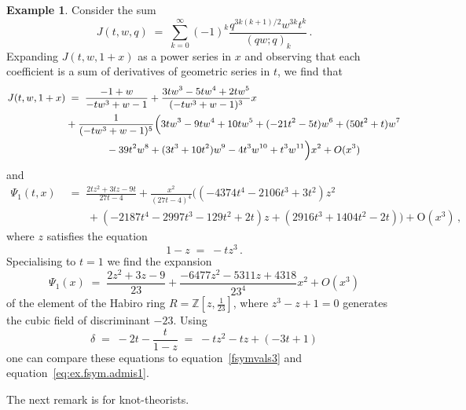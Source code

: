 \documentclass[12pt,reqno]{amsart}
\theoremstyle{definition}
\newtheorem{example}[proposition]{Example}
\def\BZ{\mathbb Z}
\def\be{\begin{equation}}
\def\ee{\end{equation}}
\def\={\;=\;}
\begin{document}
\begin{example}
\label{ex.23}
Consider the sum
\be
J(t,w,q)
\=
\sum_{k=0}^{\infty}
(-1)^{k}\frac{q^{3k(k+1)/2}w^{3k}t^k}{(qw;q)_{k}} \,.
\ee
Expanding $J(t,w,1+x)$ as a power series in $x$ and observing that each coefficient
is a sum of derivatives of geometric series in $t$, we find that
\be
\begin{small}
\begin{aligned}
J(t,w,1+x)
&\=
\frac{-1 + w}{-tw^3+w-1}
+\frac{3tw^3 - 5tw^4 + 2tw^5}{(-tw^3+w-1)^3}x \\
&+\frac{1}{(-tw^3+w-1)^5} \Big( 3tw^3 - 9tw^4 + 10tw^5 + (-21t^2 - 5t)w^6
+ (50t^2 + t)w^7 \\ &\qquad\qquad - 39t^2w^8 + (3t^3 + 10t^2)w^9
- 4t^3w^{10} + t^3w^{11} \Big) x^2
+O(x^3)
\end{aligned}
\end{small}
\ee
and
\be
\begin{aligned}
\Psi_{1}(t,x)
&\=
\frac{2tz^2 + 3tz - 9t}{27t-4}
+\frac{x^2}{(27t-4)^4}\big((-4374t^4 - 2106t^3 + 3t^2)z^2\\
&\qquad+ (-2187t^4 - 2997t^3 - 129t^2 + 2t)z
+ (2916t^3 + 1404t^2 - 2t)\big)
+\mathrm{O}(x^3) \,,
\end{aligned}
\ee
where $z$ satisfies the equation
\be
1-z\=-t z^3 \,.
\ee
Specialising to $t=1$ we find the expansion 
\be
\Psi_{1}(x)
\=
\frac{2z^2 + 3z - 9}{23}
+
\frac{-6477z^2 - 5311z + 4318}{23^4}x^2
+O(x^3)
\ee
of the element of the Habiro ring $R=\BZ[z,\tfrac{1}{23}]$, where $z^3-z+1=0$
generates the cubic field of discriminant $-23$.
Using
\be
  \delta\=-2t-\frac{t}{1-z}\=-tz^2 - tz + (-3t + 1)
\ee
one can compare these equations to equation~\eqref{fsymvals3} and
equation~\eqref{eq:ex.fsym.admis1}.
\end{example}


The next remark is for knot-theorists.
\end{document}
